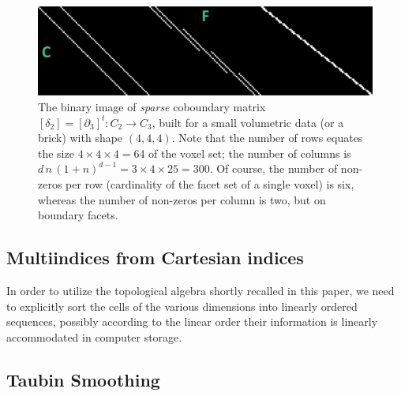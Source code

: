\begin{figure}[tbp] %
   \centering
   \includegraphics[width=0.75\linewidth]{src/figs/boundary_matrix_4x4x4_desc.png} 
   \caption{
   The binary image of \emph{sparse} coboundary matrix  $\left[\delta_2\right] = \left[\partial_3\right]^t : C_2 \to C_3$,
   built for a small volumetric data (or a brick) with shape $(4,4,4)$. Note that the number of rows equates the size $4\times 4\times 4 = 64$ of the voxel set; the number of columns is $d\,n\,(1+n)^{d-1} = 3\times 4\times 25 = 300$. Of course, the number of non-zeros per row (cardinality of the facet set of a single voxel) is six, whereas the number of non-zeros per column is two, but on boundary facets.}
   \label{fig:boundary_matrix_4x4x4}
\end{figure}

\subsection{Multiindices from Cartesian indices}\label{sec:inds-from-cart}

In order to utilize the topological algebra shortly recalled in this paper, we need to explicitly sort the cells of the various dimensions into linearly ordered sequences, possibly according to the linear order their information is linearly accommodated in computer storage. 

\subsection{Taubin Smoothing}\label{sec:taubin}


